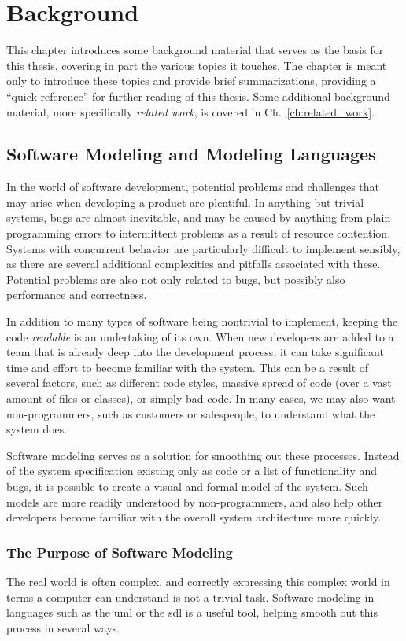 \chapter{Background}
\label{ch:background}
This chapter introduces some background material that serves as the basis for this thesis, covering in part the various topics it touches. The chapter is meant only to introduce these topics and provide brief summarizations, providing a ``quick reference'' for further reading of this thesis. Some additional background material, more specifically \emph{related work}, is covered in Ch.~\ref{ch:related_work}. 

\section{Software Modeling and Modeling Languages}
\label{sec:software_modeling}
In the world of software development, potential problems and challenges that may arise when developing a product are plentiful. In anything but trivial systems, bugs are almost inevitable, and may be caused by anything from plain programming errors to intermittent problems as a result of resource contention. Systems with concurrent behavior are particularly difficult to implement sensibly, as there are several additional complexities and pitfalls associated with these. Potential problems are also not only related to bugs, but possibly also performance and correctness.

\noindent
In addition to many types of software being nontrivial to implement, keeping the code \emph{readable} is an undertaking of its own. When new developers are added to a team that is already deep into the development process, it can take significant time and effort to become familiar with the system. This can be a result of several factors, such as different code styles, massive spread of code (over a vast amount of files or classes), or simply bad code. In many cases, we may also want non-programmers, such as customers or salespeople, to understand what the system does.

\noindent
Software modeling serves as a solution for smoothing out these processes. Instead of the system specification existing only as code or a list of functionality and bugs, it is possible to create a visual and formal model of the system. Such models are more readily understood by non-programmers, and also help other developers become familiar with the overall system architecture more quickly.

\subsection{The Purpose of Software Modeling}
\label{sec:software_modeling_purpose}
The real world is often complex, and correctly expressing this complex world in terms a computer can understand is not a trivial task. Software modeling in languages such as the \gls{uml} or the \gls{sdl} is a useful tool, helping smooth out this process in several ways.

